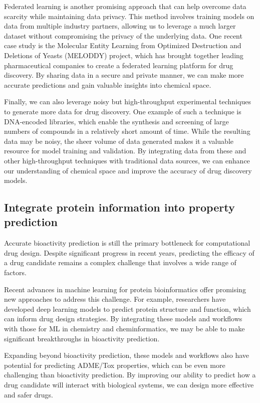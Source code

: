 Federated learning is another promising approach that can help overcome data scarcity while maintaining data privacy. This method involves training models on data from multiple industry partners, allowing us to leverage a much larger dataset without compromising the privacy of the underlying data. One recent case study is the Molecular Entity Learning from Optimized Destruction and Deletions of Yeasts (MELODDY) project, which has brought together leading pharmaceutical companies to create a federated learning platform for drug discovery. By sharing data in a secure and private manner, we can make more accurate predictions and gain valuable insights into chemical space.

Finally, we can also leverage noisy but high-throughput experimental techniques to generate more data for drug discovery. One example of such a technique is DNA-encoded libraries, which enable the synthesis and screening of large numbers of compounds in a relatively short amount of time. While the resulting data may be noisy, the sheer volume of data generated makes it a valuable resource for model training and validation. By integrating data from these and other high-throughput techniques with traditional data sources, we can enhance our understanding of chemical space and improve the accuracy of drug discovery models.

\subsection{Integrate protein information into property prediction}
Accurate bioactivity prediction is still the primary bottleneck for computational drug design. Despite significant progress in recent years, predicting the efficacy of a drug candidate remains a complex challenge that involves a wide range of factors.

Recent advances in machine learning for protein bioinformatics offer promising new approaches to address this challenge. For example, researchers have developed deep learning models to predict protein structure and function, which can inform drug design strategies. By integrating these models and workflows with those for ML in chemistry and cheminformatics, we may be able to make significant breakthroughs in bioactivity prediction.

Expanding beyond bioactivity prediction, these models and workflows also have potential for predicting ADME/Tox properties, which can be even more challenging than bioactivity prediction. By improving our ability to predict how a drug candidate will interact with biological systems, we can design more effective and safer drugs.


